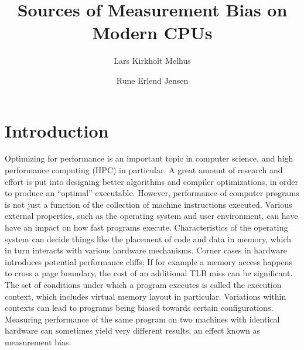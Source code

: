 \documentclass[a4paper,11pt,twocolumn,twoside]{article}
\author{Lars Kirkholt Melhus}
\author{Rune Erlend Jensen}
\affil{Norwegian University of Science and Technology}
\title{Sources of Measurement Bias on Modern CPUs}
\date{} %
\begin{document}


\section{Introduction}
Optimizing for performance is an important topic in computer science, and high performance computing (HPC) in particular. 
A great amount of research and effort is put into designing better algorithms and compiler optimizations, in order to produce an “optimal” executable. 
However, performance of computer programs is not just a function of the collection of machine instructions executed. 
Various external properties, such as the operating system and user environment, can have have an impact on how fast programs execute. 
Characteristics of the operating system can decide things like the placement of code and data in memory, which in turn interacts with various hardware mechanisms. 
Corner cases in hardware introduces potential performance cliffs; If for example a memory access happens to cross a page boundary, the cost of an additional TLB miss can be significant. 
The set of conditions under which a program executes is called the execution context, which includes virtual memory layout in particular. 
Variations within contexts can lead to programs being biased towards certain configurations. 
Measuring performance of the same program on two machines with identical hardware can sometimes yield very different results, an effect known as measurement bias.
\end{document}
